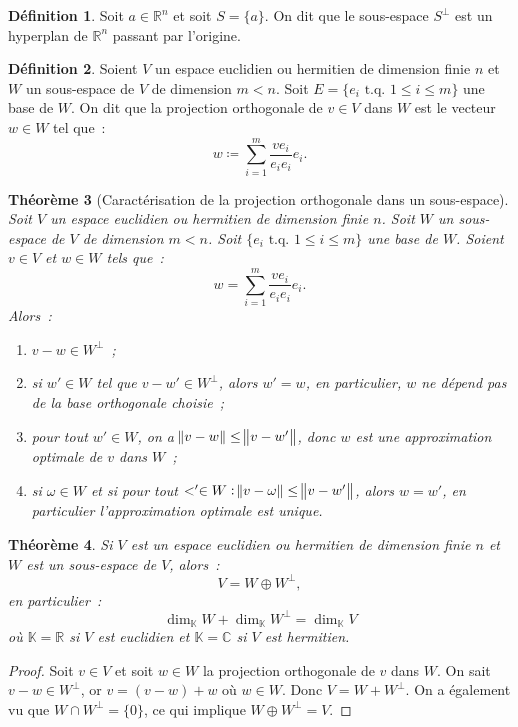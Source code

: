 \documentclass{article}
\newcommand{\R}{\mathbb R}
\newcommand{\C}{\mathbb C}
\newcommand{\K}{\mathbb K}
\newcommand{\tq}{\textrm{ t.q. }}
\newtheorem{thm}{Théorème}[section]
\theoremstyle{definition}
\newtheorem{déf}[thm]{Définition}
\theoremstyle{remark}
\begin{document}
		\begin{déf} Soit $a \in \R^n$ et soit $S = \{a\}$. On dit que le sous-espace $S^\bot$ est un hyperplan de $\R^n$ passant par l'origine.
		\end{déf}

		\begin{déf} Soient $V$ un espace euclidien ou hermitien de dimension finie $n$ et $W$ un sous-espace de $V$ de dimension $m < n$. Soit
		$E = \{e_i \tq 1 \leq i \leq m\}$ une base de $W$. On dit que la projection orthogonale de $v \in V$ dans $W$ est le vecteur $w \in W$ tel que~:
		\[w \coloneqq \sum_{i=1}^m\frac {ve_i}{e_ie_i}e_i.\]
		\end{déf}

		\begin{thm}[Caractérisation de la projection orthogonale dans un sous-espace] Soit $V$ un espace euclidien ou hermitien de dimension finie $n$.
		Soit $W$ un sous-espace de $V$ de dimension $m < n$. Soit $\{e_i \tq 1 \leq i \leq m\}$ une base de $W$. Soient $v \in V$ et $w \in W$ tels que~:
		\[w = \sum_{i=1}^m\frac {ve_i}{e_ie_i}e_i.\]
		Alors~:
		\begin{enumerate}
			\item $v - w \in W^\bot$~;
			\item si $w' \in W$ tel que $v - w' \in W^\bot$, alors $w' = w$, en particulier, $w$ ne dépend pas de la base orthogonale choisie~;
			\item pour tout $w' \in W$, on a $\norm {v-w} \leq \norm {v-w'}$, donc $w$ est une \emph{approximation optimale} de $v$ dans $W$~;
			\item si $\omega \in W$ et si pour tout $<' \in W : \norm {v-\omega} \leq \norm {v-w'}$, alors $w = w'$, en particulier l'approximation optimale
				est unique.
		\end{enumerate}
		\end{thm}

		\begin{thm} Si $V$ est un espace euclidien ou hermitien de dimension finie $n$ et $W$ est un sous-espace de $V$, alors~:
		\[V = W \oplus W^\bot,\]
		en particulier~:
		\[\dim_\K W + \dim_\K W^\bot = \dim_\K V\]
		où $\K = \R$ si $V$ est euclidien et $\K = \C$ si $V$ est hermitien.
		\end{thm}

		\begin{proof} Soit $v \in V$ et soit $w \in W$ la projection orthogonale de $v$ dans $W$. On sait $v-w \in W^\bot$, or $v = (v-w) + w$ où $w \in W$.
		Donc $V = W + W^\bot$. On a également vu que $W\cap W^\bot = \{0\}$, ce qui implique $W \oplus W^\bot = V$.
		\end{proof}
\end{document}
